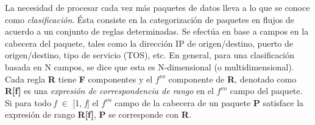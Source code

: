 La necesidad de procesar cada vez más paquetes de datos lleva a lo que se conoce como \textit{clasificación}. Ésta consiste en la categorización de paquetes en flujos de acuerdo a un conjunto de reglas determinadas. Se efectúa en base a campos en la cabecera del paquete, tales como la dirección IP de origen/destino, puerto de origen/destino, tipo de servicio (TOS), etc. En general, para una clasificación basada en N campos, se dice que esta es N-dimensional (o multidimensional). Cada regla \textbf{R} tiene \textbf{F} componentes y el $ f^{vo} $ componente de \textbf{R}, denotado como \textbf{R[f]} es una \textit{expresión de correspondencia de rango} en el $ f^{vo} $ campo del paquete. Si para todo \textit{f} $ \in $ [1, \textit{f}] el $ f^{vo} $ campo de la cabecera de un paquete \textbf{P} satisface la expresión de rango \textbf{R[f]}, \textbf{P} se corresponde con \textbf{R}.

